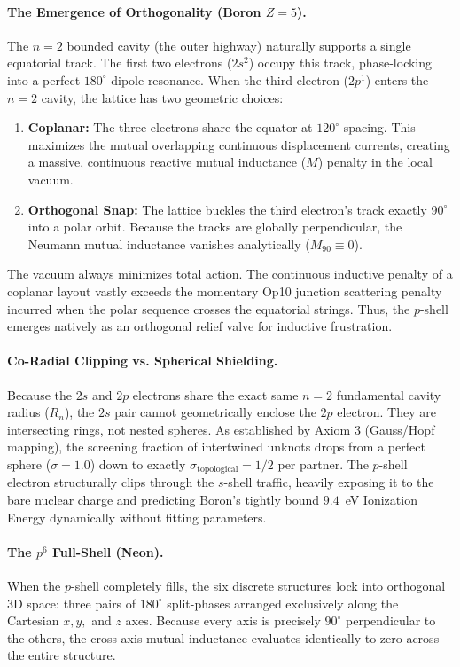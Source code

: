 \paragraph{The Emergence of Orthogonality (Boron $Z=5$).}
The $n=2$ bounded cavity (the outer highway) naturally supports a single equatorial track. The first two electrons ($2s^2$) occupy this track, phase-locking into a perfect $180^\circ$ dipole resonance.
When the third electron ($2p^1$) enters the $n=2$ cavity, the lattice has two geometric choices:
\begin{enumerate}
    \item \textbf{Coplanar:} The three electrons share the equator at $120^\circ$ spacing. This maximizes the mutual overlapping continuous displacement currents, creating a massive, continuous reactive mutual inductance ($M$) penalty in the local vacuum.
    \item \textbf{Orthogonal Snap:} The lattice buckles the third electron's track exactly $90^\circ$ into a polar orbit. Because the tracks are globally perpendicular, the Neumann mutual inductance vanishes analytically ($M_{90} \equiv 0$).
\end{enumerate}
The vacuum always minimizes total action. The continuous inductive penalty of a coplanar layout vastly exceeds the momentary Op10 junction scattering penalty incurred when the polar sequence crosses the equatorial strings. Thus, the $p$-shell emerges natively as an orthogonal relief valve for inductive frustration.

\paragraph{Co-Radial Clipping vs. Spherical Shielding.}
Because the $2s$ and $2p$ electrons share the exact same $n=2$ fundamental cavity radius ($R_n$), the $2s$ pair cannot geometrically enclose the $2p$ electron. They are intersecting rings, not nested spheres. As established by Axiom 3 (Gauss/Hopf mapping), the screening fraction of intertwined unknots drops from a perfect sphere ($\sigma = 1.0$) down to exactly $\sigma_{\text{topological}} = 1/2$ per partner. The $p$-shell electron structurally clips through the $s$-shell traffic, heavily exposing it to the bare nuclear charge and predicting Boron's tightly bound $9.4$~eV Ionization Energy dynamically without fitting parameters.

\paragraph{The $p^6$ Full-Shell (Neon).}
When the $p$-shell completely fills, the six discrete structures lock into orthogonal 3D space: three pairs of $180^\circ$ split-phases arranged exclusively along the Cartesian $x, y,$ and $z$ axes. Because every axis is precisely $90^\circ$ perpendicular to the others, the cross-axis mutual inductance evaluates identically to zero across the entire structure.


